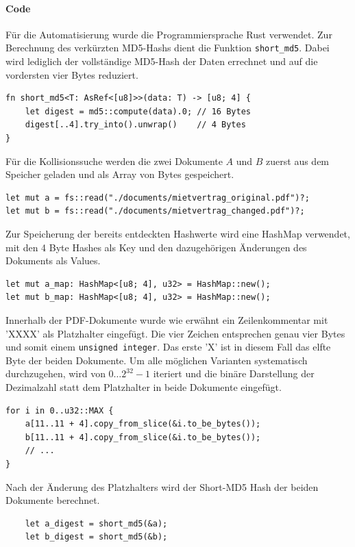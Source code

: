 \paragraph{Code} Für die Automatisierung wurde die Programmiersprache Rust verwendet.
Zur Berechnung des verkürzten MD5-Hashs dient die Funktion \verb|short_md5|.
Dabei wird lediglich der vollständige MD5-Hash der Daten errechnet und auf die
vordersten vier Bytes reduziert.
\begin{verbatim}
fn short_md5<T: AsRef<[u8]>>(data: T) -> [u8; 4] {
    let digest = md5::compute(data).0; // 16 Bytes
    digest[..4].try_into().unwrap()    // 4 Bytes
} 
\end{verbatim}
Für die Kollisionssuche werden die zwei Dokumente $A$ und $B$ zuerst aus dem Speicher geladen und als 
Array von Bytes gespeichert.
\begin{verbatim}
let mut a = fs::read("./documents/mietvertrag_original.pdf")?;
let mut b = fs::read("./documents/mietvertrag_changed.pdf")?;
\end{verbatim}
Zur Speicherung der bereits entdeckten Hashwerte wird eine HashMap verwendet, mit
den 4 Byte Hashes als Key und den dazugehörigen Änderungen des Dokuments als Values.
\begin{verbatim}
let mut a_map: HashMap<[u8; 4], u32> = HashMap::new();
let mut b_map: HashMap<[u8; 4], u32> = HashMap::new();
\end{verbatim}
Innerhalb der PDF-Dokumente wurde wie erwähnt ein Zeilenkommentar mit 'XXXX' als 
Platzhalter eingefügt. Die vier Zeichen entsprechen genau vier Bytes und somit einem
\verb|unsigned integer|. Das erste 'X' ist in diesem Fall das elfte Byte der beiden Dokumente.
Um alle möglichen Varianten systematisch durchzugehen, wird von $0\dots 2^{32} - 1$ iteriert
und die binäre Darstellung der Dezimalzahl statt dem Platzhalter in beide Dokumente eingefügt.
\begin{verbatim}
for i in 0..u32::MAX {
    a[11..11 + 4].copy_from_slice(&i.to_be_bytes());
    b[11..11 + 4].copy_from_slice(&i.to_be_bytes());
    // ...
}
\end{verbatim}
Nach der Änderung des Platzhalters wird der Short-MD5 Hash der beiden Dokumente
berechnet.
\begin{verbatim}
    let a_digest = short_md5(&a);
    let b_digest = short_md5(&b);
\end{verbatim}
